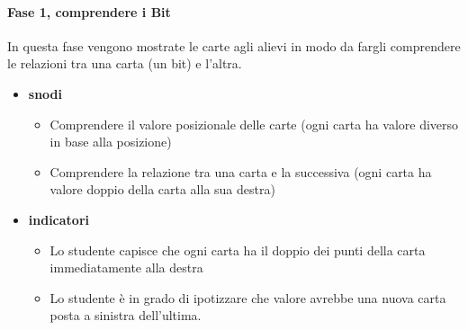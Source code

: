 \documentclass[a4paper]{article}
\begin{document}
\paragraph{Fase 1, comprendere i Bit}
In questa fase vengono mostrate le carte agli alievi in modo da fargli comprendere le relazioni tra una carta (un bit) e l'altra.
\begin{itemize}
	\item \textbf{snodi}
		\begin{itemize}[label={--}]
			\item Comprendere il valore posizionale delle carte (ogni carta ha valore diverso in base alla posizione)
			\item Comprendere la relazione tra una carta e la successiva (ogni carta ha valore doppio della carta alla sua destra)
		\end{itemize}
	\item \textbf{indicatori}
		\begin{itemize}[label={--}]
			\item Lo studente capisce che ogni carta ha il doppio dei punti della carta immediatamente alla destra
			\item Lo studente è in grado di ipotizzare che valore avrebbe una nuova carta posta a sinistra dell'ultima.
		\end{itemize}

\end{itemize}
\end{document}
